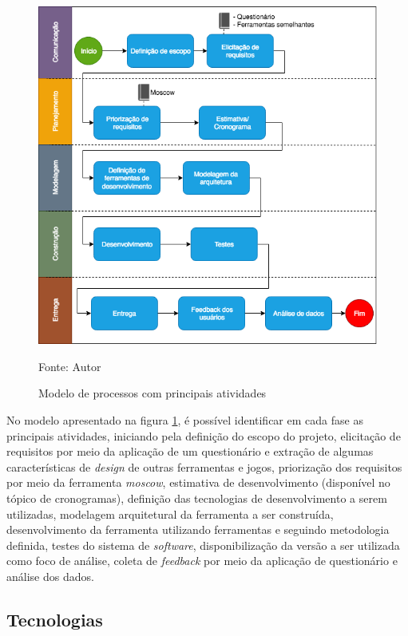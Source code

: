 \begin{figure}[h]
	\centering
	\includegraphics[keepaspectratio=true,scale=0.6]{figuras/modeloprocesso.png}
	\caption{Modelo de processos com principais atividades}
	Fonte: {Autor}
	\label{modeloprocesso}
\end{figure}	

No modelo apresentado na figura \ref{modeloprocesso}, é possível identificar em cada fase as principais atividades, iniciando pela definição
do escopo do projeto, elicitação de requisitos por meio da aplicação de um questionário e extração de algumas características
de \textit{design} de outras ferramentas e jogos, priorização dos requisitos por meio da ferramenta \textit{moscow},
 estimativa de desenvolvimento (disponível no tópico de cronogramas), definição das tecnologias de desenvolvimento a serem
 utilizadas, modelagem arquitetural da ferramenta a ser construída, desenvolvimento da ferramenta utilizando ferramentas e
 seguindo metodologia definida, testes do sistema de \textit{software}, disponibilização da versão a ser utilizada como foco 
de análise, coleta de \textit{feedback} por meio da aplicação de questionário e análise dos dados.  


\subsection{Tecnologias}

